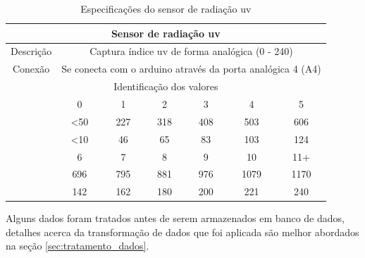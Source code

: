 \begin{center}
    \centering
    \begin{table}[H]
        \ABNTEXfontereduzida
        \caption{Especificações do sensor de radiação uv \label{table:sensor_uv}}
        \begin{tabularx}{\textwidth}{p{5cm}|c|c|c|c|c|c}
    
        \hline
    
        \multicolumn{7}{c}{\textbf{Sensor de radiação uv}} \\

        \hline
        \multicolumn{1}{c}{Descrição} & \multicolumn{6}{c}{Captura índice uv de forma analógica (0 - 240)}  \\
    
        \hline
        \multicolumn{1}{c}{Conexão} & \multicolumn{6}{c}{Se conecta com o arduino através da porta analógica 4 (A4)} \\

        \hline

        \multicolumn{7}{c}{Identificação dos valores} \\

        \hline
        \centering{Índice UV} & 0 & 1 & 2 & 3 & 4 & 5 \\

        \hline
        \centering{Voltagem (mV)} & <50 & 227 & 318 & 408 & 503  & 606 \\

        \hline
        \centering{Valor analógico} & <10 & 46 & 65 & 83 & 103 & 124 \\

        \hline
        \centering{Índice UV} & 6   & 7   & 8   & 9   & 10   & 11+  \\

        \hline
        \centering{Voltagem (mV)} & 696 & 795 & 881 & 976 & 1079 & 1170 \\

        \hline
        \centering{Valor analógico} & 142 & 162 & 180 & 200 & 221 & 240 \\
    
        \hline
    
        \end{tabularx}
    \end{table}
\end{center}

Alguns dados foram tratados antes de serem armazenados em banco de dados, detalhes acerca da transformação de dados que foi aplicada são melhor abordados na seção \ref{sec:tratamento_dados}.

